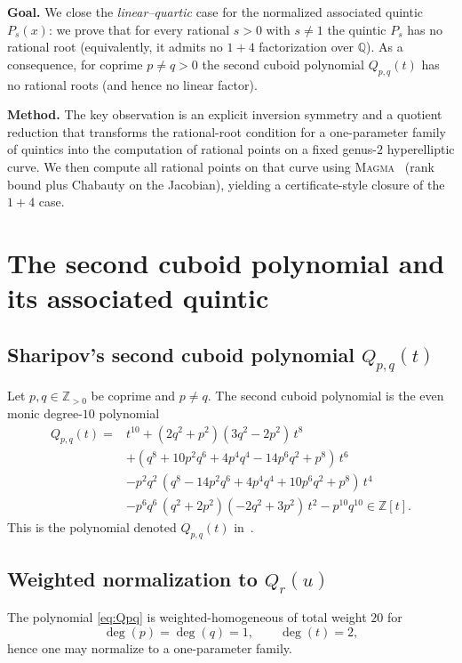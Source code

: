 \documentclass[12pt]{article}
\theoremstyle{remark}
\theoremstyle{definition}
\begin{document}
\medskip
\noindent\textbf{Goal.}
We close the \emph{linear--quartic} case for the normalized associated quintic $P_s(x)$:
we prove that for every rational $s>0$ with $s\neq 1$ the quintic $P_s$ has no rational root (equivalently, it admits no $1+4$ factorization over $\mathbb{Q}$).
As a consequence, for coprime $p\neq q>0$ the second cuboid polynomial $Q_{p,q}(t)$ has no rational roots (and hence no linear factor).

\medskip
\noindent\textbf{Method.}
The key observation is an explicit inversion symmetry and a quotient reduction that transforms the rational-root condition for a one-parameter family of quintics into the computation of rational points on a fixed genus-$2$ hyperelliptic curve.
We then compute all rational points on that curve using \textsc{Magma}~\cite{Magma} (rank bound plus Chabauty on the Jacobian), yielding a certificate-style closure of the $1+4$ case.


\section{The second cuboid polynomial and its associated quintic}\label{sec:poly}

\subsection{Sharipov's second cuboid polynomial \texorpdfstring{$Q_{p,q}(t)$}{Qp,q(t)}}
Let $p,q\in\mathbb{Z}_{>0}$ be coprime and $p\neq q$.
The second cuboid polynomial is the even monic degree-$10$ polynomial
\begin{align}
Q_{p,q}(t)
={}&t^{10} + (2 q^{2} + p^{2})(3 q^{2} - 2 p^{2})\, t^{8} \nonumber\\
&+ (q^{8} + 10 p^{2} q^{6} + 4 p^{4} q^{4} - 14 p^{6} q^{2} + p^{8})\, t^{6} \nonumber\\
&- p^{2} q^{2}\,(q^{8} - 14 p^{2} q^{6} + 4 p^{4} q^{4} + 10 p^{6} q^{2} + p^{8})\, t^{4} \nonumber\\
&- p^{6} q^{6}\,(q^{2} + 2 p^{2})(-2 q^{2} + 3 p^{2})\, t^{2}
- p^{10} q^{10}\in\mathbb{Z}[t].\label{eq:Qpq}
\end{align}
This is the polynomial denoted $Q_{p,q}(t)$ in~\cite{Sharipov2011Cuboids,Sharipov2011Note}.

\subsection{Weighted normalization to \texorpdfstring{$Q_r(u)$}{Qr(u)}}
The polynomial \eqref{eq:Qpq} is weighted-homogeneous of total weight $20$ for
\[
\deg(p)=\deg(q)=1,\qquad \deg(t)=2,
\]
hence one may normalize to a one-parameter family.
\end{document}
